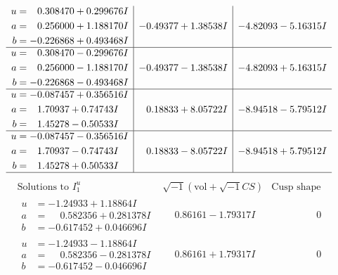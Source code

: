 \documentclass[1p]{elsarticle_modified}
\theoremstyle{definition}
\newcommand{\I}{\sqrt{-1}}
\begin{document}
$$\begin{array}{c|c|c}
\begin{aligned}
u &= \phantom{-}0.308470 + 0.299676 I \\
a &= \phantom{-}0.256000 + 1.188170 I \\
b &= -0.226868 + 0.493468 I\end{aligned}
 & -0.49377 + 1.38538 I & -4.82093 - 5.16315 I \\ \hline\begin{aligned}
u &= \phantom{-}0.308470 - 0.299676 I \\
a &= \phantom{-}0.256000 - 1.188170 I \\
b &= -0.226868 - 0.493468 I\end{aligned}
 & -0.49377 - 1.38538 I & -4.82093 + 5.16315 I \\ \hline\begin{aligned}
u &= -0.087457 + 0.356516 I \\
a &= \phantom{-}1.70937 + 0.74743 I \\
b &= \phantom{-}1.45278 - 0.50533 I\end{aligned}
 & \phantom{-}0.18833 + 8.05722 I & -8.94518 - 5.79512 I \\ \hline\begin{aligned}
u &= -0.087457 - 0.356516 I \\
a &= \phantom{-}1.70937 - 0.74743 I \\
b &= \phantom{-}1.45278 + 0.50533 I\end{aligned}
 & \phantom{-}0.18833 - 8.05722 I & -8.94518 + 5.79512 I\\
 \hline 
 \end{array}$$\newpage$$\begin{array}{c|c|c}  
\text{Solutions to }I^u_{1}& \I (\text{vol} + \sqrt{-1}CS) & \text{Cusp shape}\\
 \hline 
\begin{aligned}
u &= -1.24933 + 1.18864 I \\
a &= \phantom{-}0.582356 + 0.281378 I \\
b &= -0.617452 + 0.046696 I\end{aligned}
 & \phantom{-}0.86161 - 1.79317 I & \phantom{-0.000000 } 0 \\ \hline\begin{aligned}
u &= -1.24933 - 1.18864 I \\
a &= \phantom{-}0.582356 - 0.281378 I \\
b &= -0.617452 - 0.046696 I\end{aligned}
 & \phantom{-}0.86161 + 1.79317 I & \phantom{-0.000000 } 0 \\ \hline\begin{aligned}

\end{aligned}
\end{array}$$
\end{document}
